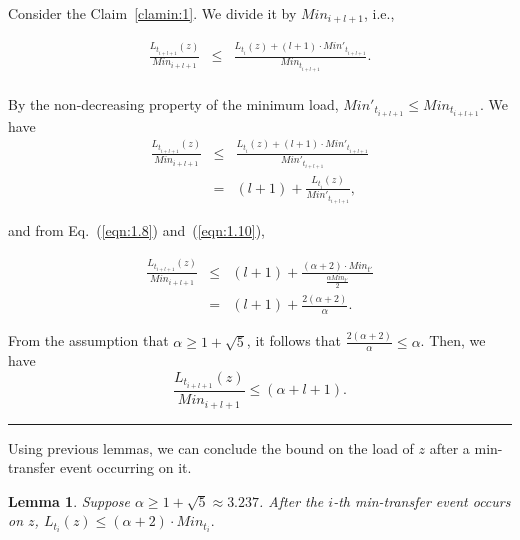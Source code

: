 \documentclass[a4paper]{article}
\newtheorem{lemma}{Lemma}
\newenvironment{proof}{{\bf Proof:}}{\hfill\rule{1.5mm}{3mm}\vspace{0.1in}}
\begin{document}
\begin{proof}
    Consider the Claim~\ref{clamin:1}. We divide it by $Min_{i+l+1}$,
  i.e.,

  \begin{eqnarray*}
    \frac{L_{t_{i+l+1}}(z)}{Min_{i+l+1}} &\leq& \frac{L_{t_i}(z)+
      (l+1)\cdot Min'_{t_{i+l+1}}}{Min_{t_{i+l+1}}}.\\
  \end{eqnarray*}
  
  By the non-decreasing property of the minimum load,
  $Min'_{t_{i+l+1}}\leq Min_{t_{i+l+1}}$. We have
  \begin{eqnarray*}\label{eqn:L/M}
    \frac{L_{t_{i+l+1}}(z)}{Min_{i+l+1}} &\leq& \frac{L_{t_i}(z)+
      (l+1)\cdot Min'_{t_{i+l+1}}}{Min'_{t_{i+l+1}}}\\
    & = & (l+1)+\frac{L_{t_i}(z)}{Min'_{t_{i+l+1}}},
  \end{eqnarray*}
 	
  and from Eq.~(\ref{eqn:1.8}) and~(\ref{eqn:1.10}),

  \begin{eqnarray*}
    \frac{L_{t_{i+l+1}}(z)}{Min_{i+l+1}} & \leq &
    (l+1)+\frac{(\alpha+2)\cdot Min_{t'}}{\frac{\alpha
        Min_{t'}}{2}}\\
    &=& (l+1)+\frac{2(\alpha+2)}{\alpha}.              
  \end{eqnarray*}
  
  From the assumption that $\alpha\geq 1+\sqrt{5}$, it follows that
  $\frac{2(\alpha+2)}{\alpha}\leq\alpha$. Then, we have
  \[
  \frac{L_{t_{i+l+1}}(z)}{Min_{i+l+1}}\leq (\alpha+l+1).
  \]
  \end{proof}

Using previous lemmas, we can conclude the bound on the load of $z$
after a min-transfer event occurring on it.

\begin{lemma}
  \label{lem:min-transfer}
  Suppose $\alpha \geq 1+\sqrt{5} \approx 3.237$. After the $i$-th
  min-transfer event occurs on $z$, $ L_{t_i}(z)\leq(\alpha + 2)\cdot
  Min_{t_i}.  $
\end{lemma}
\end{document}
